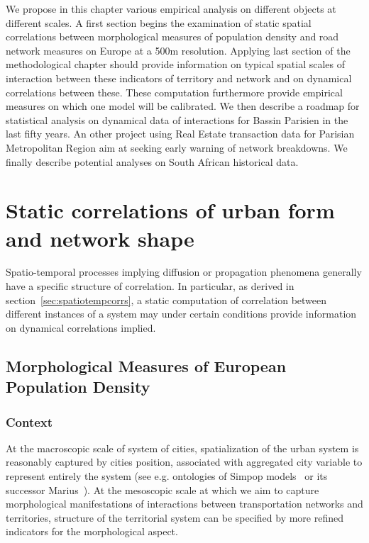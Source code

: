 We propose in this chapter various empirical analysis on different objects at different scales. A first section begins the examination of static spatial correlations between morphological measures of population density and road network measures on Europe at a 500m resolution. Applying last section of the methodological chapter should provide information on typical spatial scales of interaction between these indicators of territory and network and on dynamical correlations between these. These computation furthermore provide empirical measures on which one model will be calibrated. We then describe a roadmap for statistical analysis on dynamical data of interactions for Bassin Parisien in the last fifty years. An other project using Real Estate transaction data for Parisian Metropolitan Region aim at seeking early warning of network breakdowns. We finally describe potential analyses on South African historical data.






\newpage

\section{Static correlations of urban form and network shape}


Spatio-temporal processes implying diffusion or propagation phenomena generally have a specific structure of correlation. In particular, as derived in section~\ref{sec:spatiotempcorrs}, a static computation of correlation between different instances of a system may under certain conditions provide information on dynamical correlations implied.




\subsection{Morphological Measures of European Population Density}

\subsubsection{Context}

At the macroscopic scale of system of cities, spatialization of the urban system is reasonably captured by cities position, associated with aggregated city variable to represent entirely the system (see e.g. ontologies of Simpop models~\cite{pumain2012multi} or its successor Marius~\cite{cottineau2014evolution}). At the mesoscopic scale at which we aim to capture morphological manifestations of interactions between transportation networks and territories, structure of the territorial system can be specified by more refined indicators for the morphological aspect. 

